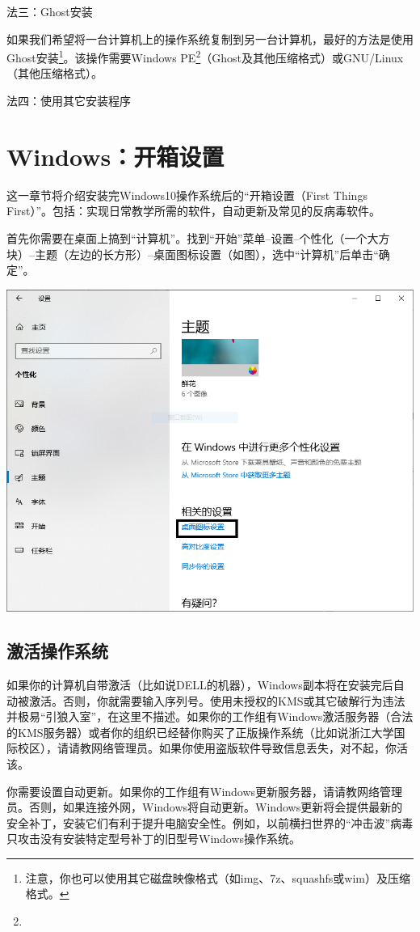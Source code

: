 \documentclass{book}
\begin{document}
法三：Ghost安装\par
如果我们希望将一台计算机上的操作系统复制到另一台计算机，最好的方法是使用Ghost安装\footnote{注意，你也可以使用其它磁盘映像格式（如img、7z、squashfs或wim）及压缩格式。}。该操作需要Windows PE\footnote{{\color{red}{警告！即使使用Microsoft提供的映像，部分PE系统会在安装系统时向计算机置入病毒程序或进行捆绑安装！}}}（Ghost及其他压缩格式）或GNU/Linux（其他压缩格式）。\par
法四：使用其它安装程序\par

\section{Windows：开箱设置}
这一章节将介绍安装完Windows10操作系统后的“开箱设置（First Things First）”。包括：实现日常教学所需的软件，自动更新及常见的反病毒软件。\par
首先你需要在桌面上搞到“计算机”。找到“开始”菜单--设置--个性化（一个大方块）--主题（左边的长方形）--桌面图标设置（如图），选中“计算机”后单击“确定”。
\begin{center}
	\includegraphics[scale=0.6]{pic/WinComp}
\end{center}
\subsection{激活操作系统}
如果你的计算机自带激活（比如说DELL的机器），Windows副本将在安装完后自动被激活。否则，你就需要输入序列号。使用未授权的KMS或其它破解行为违法并极易“引狼入室”，在这里不描述。如果你的工作组有Windows激活服务器（合法的KMS服务器）或者你的组织已经替你购买了正版操作系统（比如说浙江大学国际校区），请请教网络管理员。如果你使用盗版软件导致信息丢失，对不起，你活该。\par
你需要设置自动更新。如果你的工作组有Windows更新服务器，请请教网络管理员。否则，如果连接外网，Windows将自动更新。Windows更新将会提供最新的安全补丁，安装它们有利于提升电脑安全性。例如，以前横扫世界的“冲击波”病毒只攻击没有安装特定型号补丁的旧型号Windows操作系统。
\end{document}
